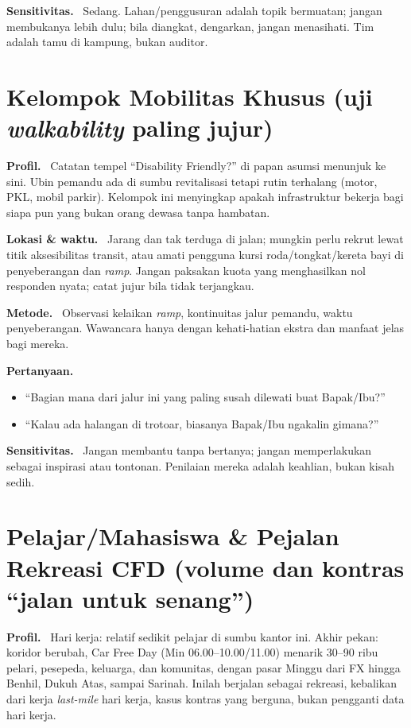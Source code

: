 \documentclass[11pt,a4paper]{report}
\newcommand{\fld}[1]{\smallskip\noindent\textbf{#1.}\ }
\begin{document}
\fld{Sensitivitas} Sedang. Lahan/penggusuran adalah topik bermuatan; jangan membukanya
lebih dulu; bila diangkat, dengarkan, jangan menasihati. Tim adalah tamu di kampung,
bukan auditor.

\section{Kelompok Mobilitas Khusus \textnormal{(uji \emph{walkability} paling jujur)}}
\fld{Profil} Catatan tempel ``Disability Friendly?'' di papan asumsi menunjuk ke sini.
Ubin pemandu ada di sumbu revitalisasi tetapi rutin terhalang (motor, PKL, mobil
parkir). Kelompok ini menyingkap apakah infrastruktur bekerja bagi siapa pun yang bukan
orang dewasa tanpa hambatan.

\fld{Lokasi \& waktu} Jarang dan tak terduga di jalan; mungkin perlu rekrut lewat titik
aksesibilitas transit, atau amati pengguna kursi roda/tongkat/kereta bayi di
penyeberangan dan \emph{ramp}. Jangan paksakan kuota yang menghasilkan nol responden
nyata; catat jujur bila tidak terjangkau.

\fld{Metode} Observasi kelaikan \emph{ramp}, kontinuitas jalur pemandu, waktu
penyeberangan. Wawancara hanya dengan kehati-hatian ekstra dan manfaat jelas bagi mereka.

\fld{Pertanyaan}
\begin{itemize}
  \item ``Bagian mana dari jalur ini yang paling susah dilewati buat Bapak/Ibu?''
  \item ``Kalau ada halangan di trotoar, biasanya Bapak/Ibu ngakalin gimana?''
\end{itemize}

\fld{Sensitivitas} Jangan membantu tanpa bertanya; jangan memperlakukan sebagai inspirasi
atau tontonan. Penilaian mereka adalah keahlian, bukan kisah sedih.

\section{Pelajar/Mahasiswa \& Pejalan Rekreasi CFD \textnormal{(volume dan kontras ``jalan untuk senang'')}}
\fld{Profil} Hari kerja: relatif sedikit pelajar di sumbu kantor ini. Akhir pekan:
koridor berubah, Car Free Day (Min 06.00--10.00/11.00) menarik 30--90 ribu pelari,
pesepeda, keluarga, dan komunitas, dengan pasar Minggu dari FX hingga Benhil, Dukuh Atas,
sampai Sarinah. Inilah berjalan sebagai rekreasi, kebalikan dari kerja \emph{last-mile}
hari kerja, kasus kontras yang berguna, bukan pengganti data hari kerja.
\end{document}
